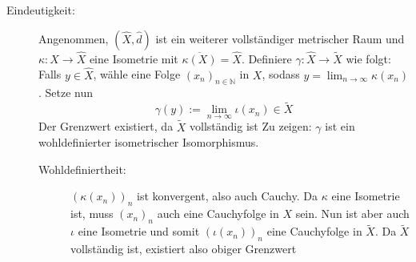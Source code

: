 \begin{description}
	\item[Eindeutigkeit:] 
	Angenommen, $(\hat{X}, \hat{d})$ ist ein weiterer vollständiger metrischer Raum und $\kappa \colon X \to \hat{X}$ eine Isometrie mit 
	$\overline{\kappa(X)}=\hat{X}$. Definiere $\gamma\colon\hat{X} \to \tilde{X}$ wie folgt: Falls $y \in \hat{X}$, wähle eine Folge $(x_n)_{n \in \mathds{N}}$ in $X$, sodass
	$y= \lim_{n \to \infty} \kappa(x_n)$. Setze nun
	\[
		\gamma(y) := \lim_{ n \to \infty} \iota(x_n) \in \tilde{X} 
	\]
	Der Grenzwert existiert, da $\tilde{X}$ vollständig ist
	Zu zeigen: $\gamma$ ist ein wohldefinierter isometrischer Isomorphismus.
	\begin{description}
		\item[Wohldefiniertheit:] $(\kappa(x_n))_n$ ist konvergent, also auch Cauchy. Da $\kappa$ eine Isometrie ist, muss $(x_n)_n$ auch eine Cauchyfolge in $X$ sein.
		Nun ist aber auch $\iota$ eine Isometrie und somit $(\iota(x_n))_n$ eine Cauchyfolge in $\tilde{X}$. Da $\tilde{X}$ vollständig ist, existiert also obiger Grenzwert
		

\end{description}
\end{description}
